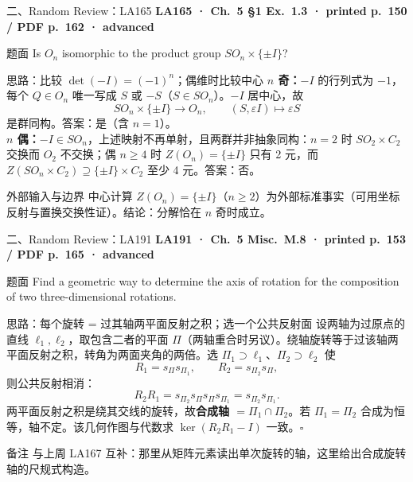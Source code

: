 \documentclass[aspectratio=169,10pt,fontset=none]{ctexbeamer}
\newcommand{\ex}[1]{\textcolor{accent}{\footnotesize\bfseries #1}}
\begin{document}
\begin{frame}[t]{二、Random Review：LA165}
  \leavevmode\ex{LA165 · Ch.~5 §1 Ex.~1.3 · printed p.~150 / PDF p.~162 · advanced}
  \begin{block}{\footnotesize 题面}
    \scriptsize Is $O_n$ isomorphic to the product group $SO_n\times\{\pm I\}$?
  \end{block}
  \begin{exampleblock}{\footnotesize 思路：比较 $\det(-I)=(-1)^n$；偶维时比较中心}
    \scriptsize
    \textbf{$n$ 奇：}$-I$ 的行列式为 $-1$，每个 $Q\in O_n$ 唯一写成 $S$ 或 $-S$（$S\in SO_n$）。$-I$ 居中心，故
    $$SO_n\times\{\pm I\}\to O_n,\qquad (S,\varepsilon I)\mapsto\varepsilon S$$
    是群同构。答案：是（含 $n=1$）。\\[2pt]
    \textbf{$n$ 偶：}$-I\in SO_n$，上述映射不再单射，且两群并非抽象同构：$n=2$ 时 $SO_2\times C_2$ 交换而 $O_2$ 不交换；偶 $n\ge4$ 时 $Z(O_n)=\{\pm I\}$ 只有 2 元，而 $Z(SO_n\times C_2)\supseteq\{\pm I\}\times C_2$ 至少 4 元。答案：否。
  \end{exampleblock}
  \begin{block}{\footnotesize 外部输入与边界}
    \scriptsize 中心计算 $Z(O_n)=\{\pm I\}$（$n\ge2$）为外部标准事实（可用坐标反射与置换交换性证）。结论：分解恰在 $n$ 奇时成立。
  \end{block}
\end{frame}

\begin{frame}[t]{二、Random Review：LA191}
  \leavevmode\ex{LA191 · Ch.~5 Misc.\ M.8 · printed p.~153 / PDF p.~165 · advanced}
  \begin{block}{\footnotesize 题面}
    \scriptsize Find a geometric way to determine the axis of rotation for the composition of two three-dimensional rotations.
  \end{block}
  \begin{exampleblock}{\footnotesize 思路：每个旋转 = 过其轴两平面反射之积；选一个公共反射面}
    \scriptsize
    设两轴为过原点的直线 $\ell_1,\ell_2$，取包含二者的平面 $\Pi$（两轴重合时另议）。绕轴旋转等于过该轴两平面反射之积，转角为两面夹角的两倍。选 $\Pi_1\supset\ell_1$、$\Pi_2\supset\ell_2$ 使
    $$R_1=s_\Pi s_{\Pi_1},\qquad R_2=s_{\Pi_2}s_\Pi,$$
    则公共反射相消：
    $$R_2R_1=s_{\Pi_2}s_\Pi s_\Pi s_{\Pi_1}=s_{\Pi_2}s_{\Pi_1}.$$
    两平面反射之积是绕其交线的旋转，故\textbf{合成轴 $=\Pi_1\cap\Pi_2$}。若 $\Pi_1=\Pi_2$ 合成为恒等，轴不定。该几何作图与代数求 $\ker(R_2R_1-I)$ 一致。$\square$
  \end{exampleblock}
  \begin{block}{\footnotesize 备注}
    \scriptsize 与上周 LA167 互补：那里从矩阵元素读出单次旋转的轴，这里给出合成旋转轴的尺规式构造。
  \end{block}
\end{frame}
\end{document}
